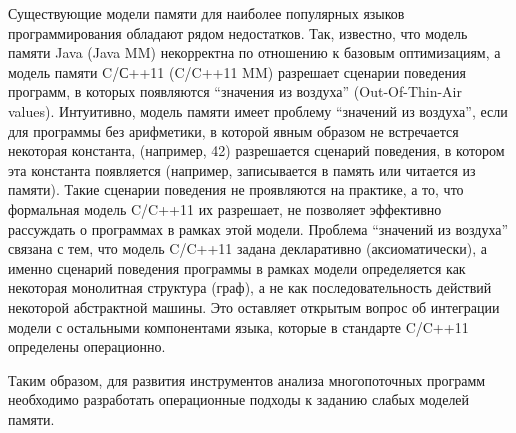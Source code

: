 

Существующие модели памяти для наиболее популярных языков программирования обладают рядом недостатков.
Так, известно, что модель памяти Java (Java MM) некорректна по отношению
к базовым оптимизациям, а модель памяти C/С++11 (C/C++11 MM) разрешает
сценарии поведения программ, в которых появляются ``значения из воздуха'' (Out-Of-Thin-Air values).
Интуитивно, модель памяти имеет проблему ``значений из воздуха'', если для программы без арифметики,
в которой явным образом не встречается некоторая константа, (например, 42) разрешается сценарий поведения,
в котором эта константа появляется (например, записывается в память или читается из памяти).
Такие сценарии поведения не проявляются на практике, а то,
что формальная модель C/C++11 их разрешает, не позволяет эффективно рассуждать о программах в рамках этой модели.
Проблема ``значений из воздуха'' связана с тем, что модель C/C++11 задана декларативно (аксиоматически), а именно сценарий поведения программы
в рамках модели определяется как некоторая монолитная структура (граф), а не как последовательность действий некоторой
абстрактной машины.
Это оставляет открытым вопрос об интеграции модели с остальными компонентами языка, которые в стандарте C/C++11 определены
операционно.

Таким образом, для развития инструментов анализа многопоточных программ необходимо
разработать операционные подходы к заданию слабых моделей памяти.

